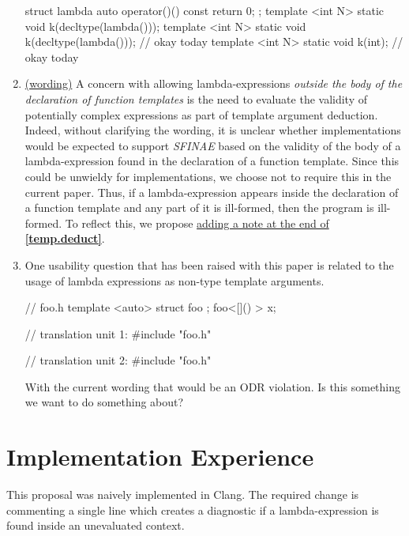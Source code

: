 \documentclass{wg21}
\begin{document}
\begin{enumerate}
\begin{cpp}
struct lambda { auto operator()() const { return 0; } };
template <int N> static void k(decltype(lambda{}()));
template <int N> static void k(decltype(lambda{}())); // okay today
template <int N> static void k(int);                  // okay today
\end{cpp}


  \item \label{discussion.sfinae}
    \hyperref[wording.sfinae]{(wording)}
    A concern with allowing lambda-expressions \textit{outside the body of
    the declaration of function templates} is the need to evaluate the validity
    of potentially complex expressions as part of template argument deduction.
    Indeed, without clarifying the wording, it is unclear whether implementations
    would be expected to support \textit{SFINAE} based on the validity of
    the body of a lambda-expression found in the declaration of a function
    template. Since this could be unwieldy for implementations, we choose not
    to require this in the current paper. Thus, if a lambda-expression appears
    inside the declaration of a function template and any part of it is ill-formed,
    then the program is ill-formed. To reflect this, we propose
    \hyperref[wording.sfinae]{adding a note at the end of \textbf{[temp.deduct]}}.

  \item \label{discussion.nontype}
    One usability question that has been raised with this paper is related
    to the usage of lambda expressions as non-type template arguments.

\begin{cpp}
// foo.h
template <auto> struct foo { };
foo<[]() {}> x;

// translation unit 1:
#include "foo.h"

// translation unit 2:
#include "foo.h"
\end{cpp}

    With the current wording that would be an ODR violation. Is this something
    we want to do something about?

\end{enumerate}


\section{Implementation Experience}
This proposal was naively implemented in Clang. The required change is commenting
a single line which creates a diagnostic if a lambda-expression is found inside an
unevaluated context.
\end{document}

